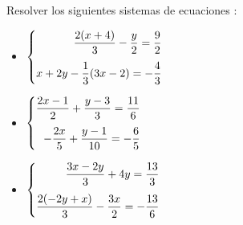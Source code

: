 \documentclass[11pt, twocolumn, landscape, a5paper]{article}
\begin{document}
Resolver los siguientes sistemas de ecuaciones :
\begin{itemize}
\item{$\begin{cases}
\hfill \dfrac{2 (x + 4)}{3} - \dfrac{y}{2} = \dfrac{9}{2} \\[10pt]
x + 2y - \dfrac1{3} (3x - 2) = - \dfrac{4}{3}
\end{cases}
$}
\item{$\begin{cases}
\dfrac{2x - 1}{2} + \dfrac{y - 3}{3} = \dfrac{11}{6} \\[10pt]
\hfill -\dfrac{2x}{5} + \dfrac{y - 1}{10} = - \dfrac{6}{5}
\end{cases}
$}
\item{$\begin{cases}
\hfill\dfrac{3x - 2y}{3} + 4y = \dfrac{13}{3} \\[10pt]
\dfrac{2(-2y + x)}{3} - \dfrac{3x}{2} = - \dfrac{13}{6}
\end{cases}
$}
\end{itemize}
\end{document}
